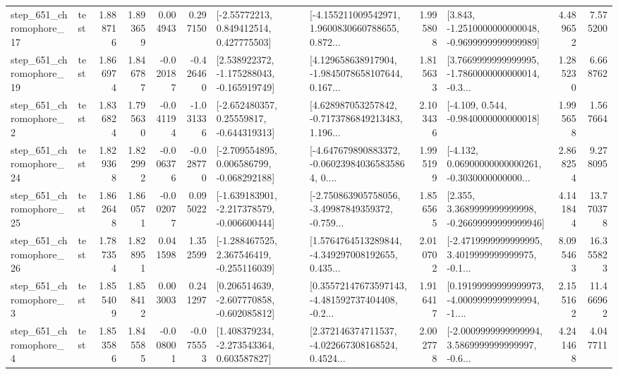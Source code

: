 \begin{tabular}{llrrrrllrlrr}
  step\_651\_chromophore\_17 &      test &      1.888716 &    1.893659 &      0.004943 &  0.297150 &     [-2.55772213, 0.849412514, 0.427775503] &  [-4.155211009542971, 1.9600830660788655, 0.872... &       1.995808 &  [3.843, -1.2510000000000048, -0.9699999999999989] &            4.489652 &          7.575200 \\
  step\_651\_chromophore\_19 &      test &      1.866974 &    1.846787 &     -0.020187 & -0.426460 &   [2.538922372, -1.175288043, -0.165919749] &  [4.129658638917904, -1.9845078658107644, 0.167... &       1.815633 &  [3.7669999999999995, -1.7860000000000014, -0.3... &            1.285230 &          6.668762 \\
   step\_651\_chromophore\_2 &      test &      1.836824 &    1.795630 &     -0.041194 & -1.031336 &    [-2.652480357, 0.25559817, -0.644319313] &  [4.628987053257842, -0.7173786849213483, 1.196... &       2.103436 &               [-4.109, 0.544, -0.9840000000000018] &            1.995658 &          1.567664 \\
  step\_651\_chromophore\_24 &      test &      1.829368 &    1.822992 &     -0.006376 & -0.028770 &   [-2.709554895, 0.006586799, -0.068292188] &  [-4.647679890883372, -0.060239840365835864, 0.... &       1.995199 &  [-4.132, 0.06900000000000261, -0.3030000000000... &            2.868254 &          9.278095 \\
  step\_651\_chromophore\_25 &      test &      1.862648 &    1.860571 &     -0.002077 &  0.095022 &  [-1.639183901, -2.217378579, -0.006600444] &  [-2.750863905758056, -3.49987849359372, -0.759... &       1.856565 &  [2.355, 3.3689999999999998, -0.26699999999999946] &            4.141844 &         13.770378 \\
  step\_651\_chromophore\_26 &      test &      1.787354 &    1.828951 &      0.041598 &  1.352599 &   [-1.288467525, 2.367546419, -0.255116039] &  [1.5764764513289844, -4.349297008192655, 0.435... &       2.010702 &  [-2.4719999999999995, 3.4019999999999975, -0.1... &            8.095463 &         16.355823 \\
   step\_651\_chromophore\_3 &      test &      1.855409 &    1.858412 &      0.003003 &  0.241297 &   [0.206514639, -2.607770858, -0.602085812] &  [0.35572147673597143, -4.481592737404408, -0.2... &       1.916417 &  [0.19199999999999973, -4.0009999999999994, -1.... &            2.155162 &         11.466962 \\
   step\_651\_chromophore\_4 &      test &      1.853586 &    1.845585 &     -0.008001 & -0.075553 &    [1.408379234, -2.273543364, 0.603587827] &  [2.372146374711537, -4.022667308168524, 0.4524... &       2.002778 &  [-2.0009999999999994, 3.5869999999999997, -0.6... &            4.241468 &          4.047711 \\

\end{tabular}
